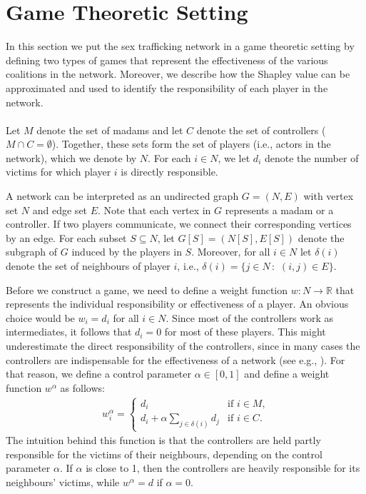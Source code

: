 \documentclass[10p]{article}
\theoremstyle{definition}
\theoremstyle{definition}
\begin{document}
\section{Game Theoretic Setting} \label{GameTheoreticalSetting}
In this section we put the sex trafficking network in a game theoretic setting by defining two types of games that represent the effectiveness of the various coalitions in the network. Moreover, we describe how the Shapley value \cite{shapley1953value} can be approximated and used to identify the responsibility of each player in the network.\\ \\
Let $M$ denote the set of madams and let $C$ denote the set of controllers ($M \cap C =\emptyset$). Together, these sets form the set of players (i.e., actors in the network), which we denote by $N$. For each $i \in N$, we let $d_i$ denote the number of victims for which player $i$ is directly responsible. 

A network can be interpreted as an undirected graph $G = (N,E)$ with vertex set $N$ and edge set $E$. Note that each vertex in $G$ represents a madam or a controller. If two players communicate, we connect their corresponding vertices by an edge. For each subset $S \subseteq N$, let $G[S] = (N[S], E[S])$ denote the subgraph of $G$ induced by the players in $S$. Moreover, for all $i \in N$ let $\delta(i)$ denote the set of neighbours of player $i$, i.e., $\delta(i) = \{ j \in N \, : \, \, (i,j) \in E\}$.

Before we construct a game, we need to define a weight function $w : N \rightarrow \mathbb{R}$ that represents the individual responsibility or effectiveness of a player. An obvious choice would be $w_i = d_i$ for all $i \in N$. Since most of the controllers work as intermediates, it follows that $d_i = 0$ for most of these players. This might underestimate the direct responsibility of the controllers, since in many cases the controllers are indispensable for the effectiveness of a network (see e.g., \cite{mancuso2014not}). For that reason, we define a control parameter $\alpha \in [0,1]$ and define a weight function $w^\alpha$ as follows:
\begin{align*}
    w^\alpha_i = \begin{cases} d_i & \text{if $i \in M$,} \\d_i + 
    \alpha \sum_{j \in \delta(i)}d_j & \text{if $i \in C$.}
    \end{cases}
\end{align*}
The intuition behind this function is that the controllers are held partly responsible for the victims of their neighbours, depending on the control parameter $\alpha$. If $\alpha$ is close to 1, then the controllers are heavily responsible for its neighbours' victims, while $w^\alpha = d$ if $\alpha = 0$.
\end{document}
